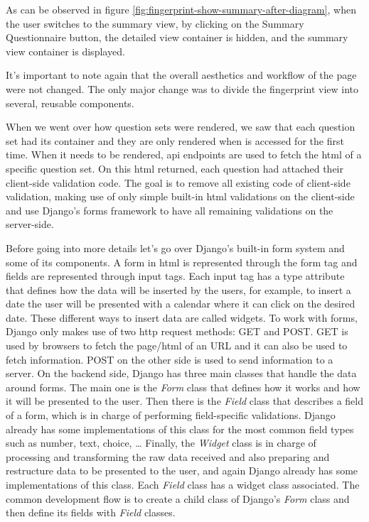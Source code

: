 As can be observed in figure \ref{fig:fingerprint-show-summary-after-diagram}, when the user switches to the summary view, by clicking on the Summary Questionnaire button, the detailed view container is hidden, and the summary view container is displayed.

It's important to note again that the overall aesthetics and workflow of the page were not changed.
The only major change was to divide the fingerprint view into several, reusable components.

When we went over how question sets were rendered, we saw that each question set had its container and they are only rendered when is accessed for the first time.
When it needs to be rendered, \gls{api} endpoints are used to fetch the \gls{html} of a specific question set.
On this \gls{html} returned, each question had attached their client-side validation code.
The goal is to remove all existing code of client-side validation, making use of only simple built-in \gls{html} validations on the client-side and use Django's forms framework to have all remaining validations on the server-side.

Before going into more details let's go over Django's built-in form system and some of its components.
A form in \gls{html} is represented through the form tag and fields are represented through input tags.
Each input tag has a type attribute that defines how the data will be inserted by the users, for example, to insert a date the user will be presented with a calendar where it can click on the desired date.
These different ways to insert data are called widgets.
To work with forms, Django only makes use of two \gls{http} request methods: GET and POST.
GET is used by browsers to fetch the page/\gls{html} of an URL and it can also be used to fetch information.
POST on the other side is used to send information to a server.
On the backend side, Django has three main classes that handle the data around forms.
The main one is the \textit{Form} class that defines how it works and how it will be presented to the user.
Then there is the \textit{Field} class that describes a field of a form, which is in charge of performing field-specific validations.
Django already has some implementations of this class for the most common field types such as number, text, choice, \dots
Finally, the \textit{Widget} class is in charge of processing and transforming the raw data received and also preparing and restructure data to be presented to the user, and again Django already has some implementations of this class.
Each \textit{Field} class has a widget class associated.
The common development flow is to create a child class of Django's \textit{Form} class and then define its fields with \textit{Field} classes.

